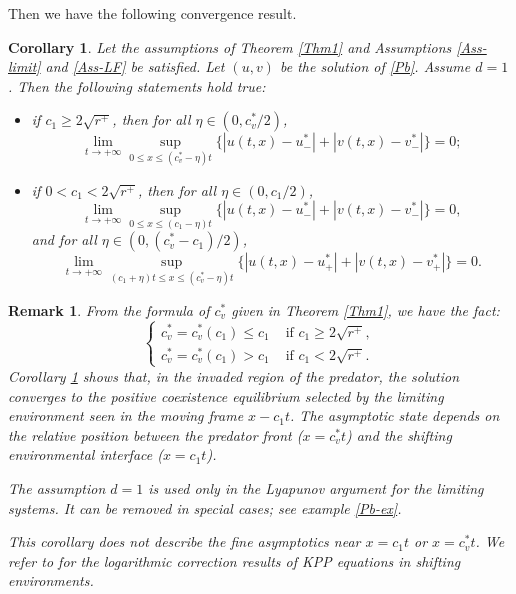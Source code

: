 \documentclass[10pt]{article}
\numberwithin{equation}{section}
\newtheorem{corollary}[theorem]{Corollary}
\newtheorem{remark}[theorem]{Remark}
\begin{document}
Then we have the following convergence result.
\begin{corollary}\label{Cor2}
Let the assumptions  of Theorem \ref{Thm1} and Assumptions \ref{Ass-limit} and \ref{Ass-LF}  be satisfied. 
 Let $(u,v)$ be the solution of  \eqref{Pb}.   Assume $d=1$.  Then   the following statements  hold true:  
\begin{itemize}
\item[(i)]  if $c_1\geq  2\sqrt{r^+}$, then for all  $\eta\in (0,  c_v^*/2)$,
\begin{equation}\label{22}
\lim_{t \to +\infty} \sup_{ 0\leq x\leq (c_v^*- \eta) t}\big\{ \left| u(t,x)-u^*_{-}  \right| + \left| v(t,x) - v^*_{-}\right|     \big\} =0;
\end{equation}
\item [(ii)] if $0<c_1< 2\sqrt{r^+}$,  then for all  $\eta\in (0, c_1/2)$,
\begin{equation}\label{33}
\lim_{t \to +\infty} \sup_{ 0 \leq x \leq (c_1- \eta) t}\big\{ \left| u(t,x)-u^*_{-}  \right| + \left| v(t,x) - v^*_{-}\right|     \big\} =0,
\end{equation}
and for all $\eta\in (0, (c_v^* -c_1) / 2)$, 
\begin{equation}\label{44}
\lim_{t \to +\infty} \sup_{ (c_1+ \eta ) t \leq x \leq (c_v^*- \eta) t}\big\{ \left| u(t,x)-u^*_{+}  \right| + \left| v(t,x) - v^*_{+}\right|     \big\} =0.
\end{equation}
 \end{itemize}

\end{corollary}

\begin{remark} 
\rm
From the formula of $c_v^*$ given in  Theorem \ref{Thm1}, we have the   fact:  
\begin{equation*}
 \begin{cases}
 c_v^*= c_v^*(c_1) 
 \leq c_1   &\text{ if } c_1\geq 2\sqrt{r^+},\\
  c_v^*= c_v^*(c_1) >c_1    &\text{ if } c_1 <2\sqrt{r^+}.
\end{cases}
\end{equation*}
Corollary \ref{Cor2}  shows that, in the invaded region of the predator,   the solution converges to the positive coexistence equilibrium selected by the limiting environment seen in the moving frame  $ x-c_1t$.  The asymptotic state depends on the relative position between the predator front ($x=c_v^* t$) and the shifting environmental interface ($x=c_1 t$). 

The assumption $d=1$ is  used only in the Lyapunov argument for the limiting systems. It can be removed in special cases; see example \eqref{Pb-ex}.

This corollary does not describe the  fine asymptotics  near $x=c_1t$ or  $x=c_v^*t$. We refer to \cite{lam-wu2025logarithmic} for  the logarithmic correction results  of KPP equations in shifting environments.
\end{remark}
\end{document}
